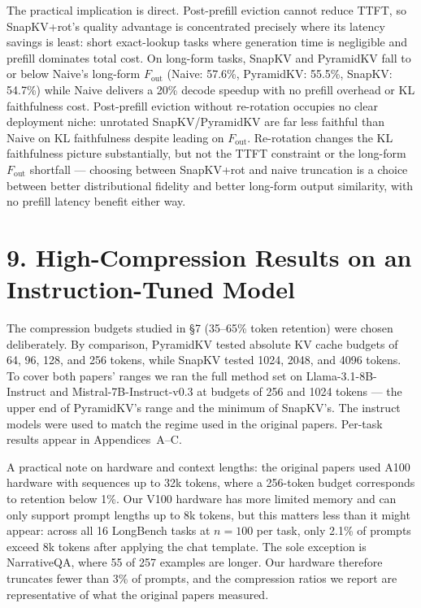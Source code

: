 \documentclass[10pt,letterpaper]{article}
\begin{document}
The practical implication is direct. Post-prefill eviction cannot reduce
TTFT, so SnapKV+rot's quality advantage is concentrated precisely where
its latency savings is least: short exact-lookup tasks where generation
time is negligible and prefill dominates total cost. On long-form tasks,
SnapKV and PyramidKV fall to or below Naive's long-form \(F_{\text{out}}\)
(Naive: 57.6\%, PyramidKV: 55.5\%, SnapKV: 54.7\%) while Naive delivers a 20\%
decode speedup with no prefill overhead or KL faithfulness cost.
Post-prefill eviction without re-rotation occupies no clear deployment
niche: unrotated SnapKV/PyramidKV are far less faithful than Naive on KL
faithfulness despite leading on \(F_{\text{out}}\). Re-rotation changes
the KL faithfulness picture substantially, but not the TTFT constraint
or the long-form \(F_{\text{out}}\) shortfall --- choosing between
SnapKV+rot and naive truncation is a choice between better
distributional fidelity and better long-form output similarity, with no
prefill latency benefit either way.

\hypertarget{high-compression-instruct}{%
\section{9. High-Compression Results on an Instruction-Tuned
Model}\label{high-compression-instruct}}

The compression budgets studied in §7 (35--65\% token retention) were
chosen deliberately. By comparison, PyramidKV tested absolute KV cache
budgets of 64, 96, 128, and 256 tokens, while SnapKV tested 1024, 2048, and
4096 tokens. To cover both papers' ranges we ran the full method set on
Llama-3.1-8B-Instruct and Mistral-7B-Instruct-v0.3 at budgets of 256 and 1024 tokens --- the upper
end of PyramidKV's range and the minimum of SnapKV's. 
The instruct models were used to match the regime used in the original papers.
Per-task results appear in Appendices~A--C. 

A practical note on hardware and context lengths: the original papers
used A100 hardware with sequences up to 32k tokens, where a 256-token
budget corresponds to retention below 1\%. Our V100 hardware has more
limited memory and can only support prompt lengths up to 8k tokens, 
but this matters less than it might appear: across all
16 LongBench tasks at $n = 100$ per task, only 2.1\% of prompts exceed
8k tokens after applying the chat template. The sole exception is
NarrativeQA, where 55 of 257 examples are longer. Our hardware
therefore truncates fewer than 3\% of prompts, and the compression
ratios we report are representative of what the original papers measured.
\end{document}
